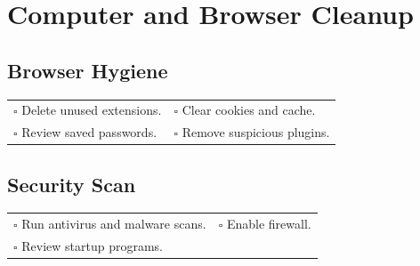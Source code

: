 
\section{Computer and Browser Cleanup}
\label{sec:computer}

\subsection{Browser Hygiene}

\begin{tabular}{p{9cm} p{8cm}}
$\square$ Delete unused extensions. & $\square$ Clear cookies and cache. \\ 
$\square$ Review saved passwords. & $\square$ Remove suspicious plugins. \\ 
\end{tabular}

\subsection{Security Scan}

\begin{tabular}{p{9cm} p{8cm}}
$\square$ Run antivirus and malware scans. & $\square$ Enable firewall. \\ 
$\square$ Review startup programs. & \\ 
\end{tabular}

